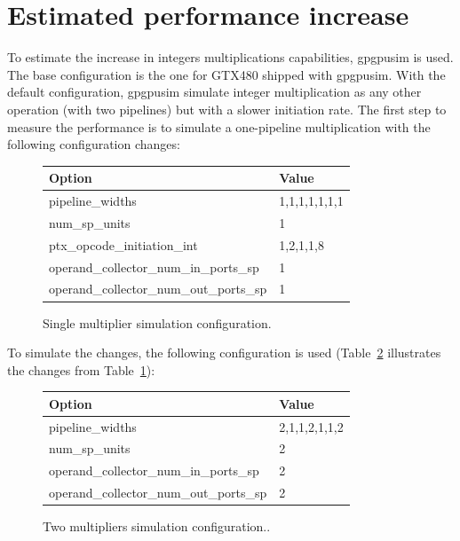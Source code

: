 \documentclass{report}
\begin{document}
   \section{Estimated performance increase}
    To estimate the increase in integers multiplications capabilities, gpgpusim
    is used. The base configuration is the one for GTX480 shipped with gpgpusim.
    With the default configuration, gpgpusim simulate integer multiplication as
    any other operation (with two pipelines) but with a slower initiation rate.
    The first step to measure the performance is to simulate a one-pipeline
    multiplication with the following configuration changes:
    \begin{figure}[H]
    \centering
       \begin{tabular}{ | l | l | }
            \hline
    	    Option & Value \\ \hline
    	    pipeline\_widths & 1,1,1,1,1,1,1 \\
            num\_sp\_units & 1 \\
            ptx\_opcode\_initiation\_int & 1,2,1,1,8 \\
            operand\_collector\_num\_in\_ports\_sp & 1 \\
            operand\_collector\_num\_out\_ports\_sp & 1 \\ \hline

  	    \end{tabular}
  	\captionsetup{justification=centering}
  	\caption{Single multiplier simulation configuration.}
  	\label{tab:1stconfig}
    \end{figure}

    To simulate the changes, the following configuration is used (Table~\ref{tab:2ndconfig}
    illustrates the changes from Table~\ref{tab:1stconfig}):
    \begin{figure}[H]
    \centering
        \begin{tabular}{ | l | l | }
    	    \hline
    	    Option & Value \\ \hline
    	    pipeline\_widths & 2,1,1,2,1,1,2 \\
            num\_sp\_units & 2 \\
            operand\_collector\_num\_in\_ports\_sp & 2 \\
            operand\_collector\_num\_out\_ports\_sp & 2 \\ \hline
  	    \end{tabular}
  	\captionsetup{justification=centering}
  	\caption{Two multipliers simulation configuration..}
  	\label{tab:2ndconfig}
    \end{figure}
\end{document}
